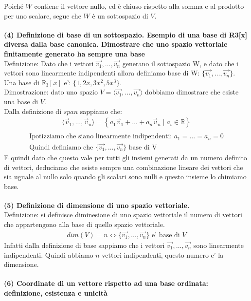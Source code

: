 \documentclass[10pt]{extarticle}
\begin{document}
Poiché $W$ contiene il vettore nullo, ed è chiuso rispetto alla somma e al prodotto per uno scalare, segue che $W$ è un sottospazio di $V$. \\
\vspace{1em}\\
\textbf{(4) Definizione di base di un sottospazio. Esempio di una base di R3[x] diversa dalla base 
canonica. Dimostrare che uno spazio vettoriale finitamente generato ha sempre una base}\\
Definizione: Dato che i vettori $\vec{v_1},\dots,\vec{v_n}$ generano il sottospazio W, e dato che i vettori sono linearmente indipendenti allora definiamo base di W: $\{\vec{v_1},\dots,\vec{v_n}\}$. \\
Una base di $\mathbb{R}_3[x]$ e': $\{1,2x,3x^2, 5x^3\}$. \\
Dimostrazione: dato uno spazio $V = \langle\vec{v_1},\dots,\vec{v_n}\rangle$ dobbiamo dimostrare che esiste una base di $V$. \\
Dalla definizione di $span$ sappiamo che:
\begin{align*}
    \langle \vec{v}_1, \dots, \vec{v}_n \rangle = \left\{ a_1 \vec{v}_1 + \dots + a_n \vec{v}_n \mid a_i \in \mathbb{R} \right\} \\
\end{align*}
\begin{align*}
    \text{Ipotizziamo che siano linearmente indipendenti: } a_1=\dots=a_n=0 \\
    \text{Quindi definiamo che } \{\vec{v_1},\dots,\vec{v_n}\} \text{ base di V}
\end{align*}
E quindi dato che questo vale per tutti gli insiemi generati da un numero definito di vettori, deduciamo che esiste sempre una combinazione lineare dei vettori che sia uguale al nullo solo quando gli scalari sono nulli e questo insieme lo chimiamo base. \\
\vspace{1em} \\
\textbf{(5) Definizione di dimensione di uno spazio vettoriale.} \\
Definizione: si definisce diminesione di uno spazio vettoriale il numero di vettori che appartengono alla base di quello spazio vettoriale.
\begin{align*}
    dim(V)=n \iff \{{\vec{v_1},\dots,\vec{v_n}}\} \text{ e' base di } V
\end{align*}
Infatti dalla definizione di base sappiamo che i vettori $\vec{v_1},\dots,\vec{v_n}$ sono linearmente indipendenti. Quindi abbiamo $n$ vettori indipendenti, questo numero e' la dimensione. \\
\vspace{1em} \\
\textbf{(6) Coordinate di un vettore rispetto ad una base ordinata: definizione, esistenza e unicità} \\
\end{document}
